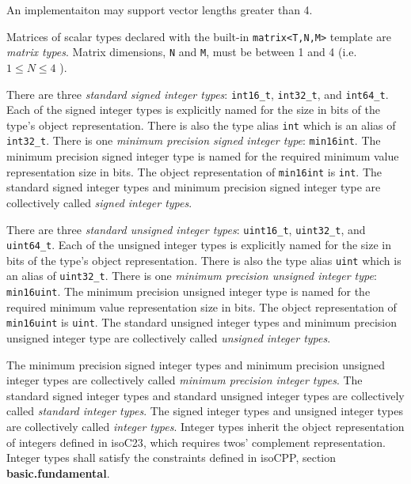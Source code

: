 \begin{note}
  An implementaiton may support vector lengths greater than 4.
\end{note}

\p Matrices of scalar types declared with the built-in \texttt{matrix<T,N,M>}
template are \textit{matrix types}. Matrix dimensions, \texttt{N} and
\texttt{M}, must be between 1 and 4 (i.e. \( 1 \leq N \leq 4 \) ).


\p There are three \textit{standard signed integer types}: \texttt{int16\_t},
\texttt{int32\_t}, and \texttt{int64\_t}. Each of the signed integer types is
explicitly named for the size in bits of the type's object representation. There
is also the type alias \texttt{int} which is an alias of \texttt{int32\_t}.
There is one \textit{minimum precision signed integer type}: \texttt{min16int}.
The minimum precision signed integer type is named for the required minimum
value representation size in bits. The object representation of
\texttt{min16int} is \texttt{int}. The standard signed integer types and minimum
precision signed integer type are collectively called \textit{signed integer
types}.

\p There are three \textit{standard unsigned integer types}: \texttt{uint16\_t},
\texttt{uint32\_t}, and \texttt{uint64\_t}. Each of the unsigned integer types
is explicitly named for the size in bits of the type's object representation.
There is also the type alias \texttt{uint} which is an alias of
\texttt{uint32\_t}. There is one \textit{minimum precision unsigned integer
type}: \texttt{min16uint}. The minimum precision unsigned integer type is named
for the required minimum value representation size in bits. The object
representation of \texttt{min16uint} is \texttt{uint}. The standard unsigned
integer types and minimum precision unsigned integer type are collectively
called \textit{unsigned integer types}.

\p The minimum precision signed integer types and minimum precision unsigned
integer types are collectively called \textit{minimum precision integer types}.
The standard signed integer types and standard unsigned integer types are
collectively called \textit{standard integer types}. The signed integer types
and unsigned integer types are collectively called \textit{integer types}.
Integer types inherit the object representation of integers defined in
\glsdesc{isoC23}, which requires twos' complement representation. Integer types
shall satisfy the constraints defined in \glsdesc{isoCPP}, section
\textbf{basic.fundamental}.

